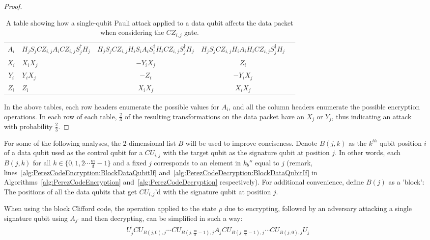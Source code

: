 \begin{proof}
\begin{table}[H]
\caption{A table showing how a single-qubit Pauli attack applied to a data qubit affects the data packet  when considering the $CZ_{i,j}$ gate. \label{table:dataQubitAttackTransformation3}}
\begin{adjustwidth}{-3.25cm}{-3.25cm} 
\begin{center}
\begin{tabular}{ |cV{4}c|c|c| }
\hline
$A_{i}$ & $H_jS_j\mathit{CZ}_{i,j}A_i\mathit{CZ}_{i,j}S_j^{\dagger}H_j$ & $H_jS_j\mathit{CZ}_{i,j}H_{i} S_{i}A_iS_i^{\dagger}H_i\mathit{CZ}_{i,j}S_j^{\dagger}H_j$ & $H_jS_j\mathit{CZ}_{i,j}H_iA_iH_i\mathit{CZ}_{i,j}S_j^{\dagger}H_j$\\
 $X_{i}$ & $X_iX_j$ & $-Y_iX_j$ & $Z_i$\\
\hline $Y_{i}$ & $Y_iX_j$ & $-Z_i$ & $-Y_iX_j$\\
\hline $Z_{i}$ & $Z_i$ & $X_iX_j$ & $X_iX_j$\\
\hline
\end{tabular}
\end{center}
\end{adjustwidth}
\end{table}
In the above tables, each row headers enumerate the possible values for $A_i$, and all the column headers enumerate the possible encryption operations. In each row of each table, $\frac{2}{3}$ of the resulting transformations on the data packet have an $X_j$ or $Y_j$, thus indicating an attack with probability $\frac{2}{3}$.
\end{proof}
For some of the following analyses, the $2$-dimensional list $B$ will be used to improve conciseness. Denote $B(j,k)$ as the $k^{th}$ qubit position $i$ of a data qubit used as the control qubit for a $\mathit{CU}_{i,j}$ with the target qubit as the signature qubit at position $j$. In other words, each $B(j,k)$ for all $k \in \{0,1,2 \cdots \frac{m}{d} - 1\}$ and a fixed $j$ corresponds to an element in $k_b''$ equal to $j$ (remark, lines~\ref{alg:PerezCodeEncryption:BlockDataQubitIf} and~\ref{alg:PerezCodeDecryption:BlockDataQubitIf} in Algorithms~\ref{alg:PerezCodeEncryption} and~\ref{alg:PerezCodeDecryption} respectively). For additional convenience, define $B(j)$ as a 'block': The positions of all the data qubits that get $\mathit{CU}_{i,j}$'d with the signature qubit at position $j$.
\begin{myLemmarep}
\label{lemma:integrityEncryptionRearrangement2}
When using the block Clifford code, the operation applied to the state $\rho$ due to encrypting, followed by an adversary attacking a single signature qubit using $A_{j'}$ and then decrypting, can be simplified in such a way:
\begin{align}
&U_j^{\dagger}\mathit{CU}_{B(j,0),j} \cdots \mathit{CU}_{B(j,\frac{m}{d}-1),j} A_{j} \mathit{CU}_{B(j,\frac{m}{d}-1),j} \cdots \mathit{CU}_{B(j,0),j} U_j \label{eq:integrityEncryptionRearrangement2}
\end{align}
\end{myLemmarep}
